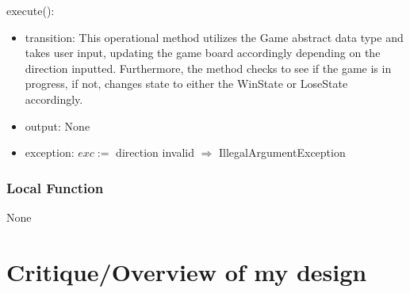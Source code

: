\documentclass[12pt]{article}
\begin{document}
\noindent execute():
\begin{itemize}
\item transition: This operational method utilizes the Game abstract data type and takes user input, updating the game board accordingly depending on the direction inputted. Furthermore, the method checks to see if the game is in progress, if not, changes state to either the WinState or LoseState accordingly.
\item output: None
\item exception: $exc :=$ direction invalid $\Rightarrow$ IllegalArgumentException
\end{itemize}

\subsubsection* {Local Function}

None

\newpage

\section*{Critique/Overview of my design}
\end{document}
